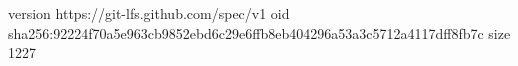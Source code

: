 version https://git-lfs.github.com/spec/v1
oid sha256:92224f70a5e963cb9852ebd6c29e6ffb8eb404296a53a3c5712a4117dff8fb7c
size 1227
